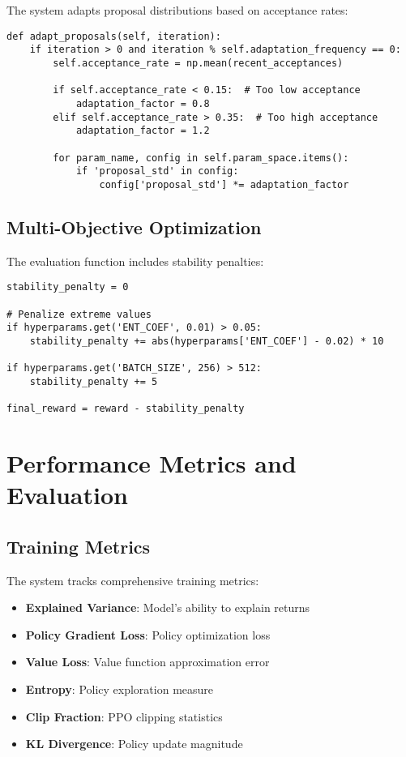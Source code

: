 \documentclass[11pt,a4paper]{article}
\begin{document}
The system adapts proposal distributions based on acceptance rates:

\begin{lstlisting}[caption={Adaptive Proposals (hyperparameter\_optimizer.py:359-379)}]
def adapt_proposals(self, iteration):
    if iteration > 0 and iteration % self.adaptation_frequency == 0:
        self.acceptance_rate = np.mean(recent_acceptances)
        
        if self.acceptance_rate < 0.15:  # Too low acceptance
            adaptation_factor = 0.8
        elif self.acceptance_rate > 0.35:  # Too high acceptance
            adaptation_factor = 1.2
            
        for param_name, config in self.param_space.items():
            if 'proposal_std' in config:
                config['proposal_std'] *= adaptation_factor
\end{lstlisting}

\subsection{Multi-Objective Optimization}

The evaluation function includes stability penalties:

\begin{lstlisting}[caption={Multi-Objective Evaluation (hyperparameter\_optimizer.py:272-283)}]
stability_penalty = 0

# Penalize extreme values
if hyperparams.get('ENT_COEF', 0.01) > 0.05:
    stability_penalty += abs(hyperparams['ENT_COEF'] - 0.02) * 10

if hyperparams.get('BATCH_SIZE', 256) > 512:
    stability_penalty += 5

final_reward = reward - stability_penalty
\end{lstlisting}

\section{Performance Metrics and Evaluation}

\subsection{Training Metrics}

The system tracks comprehensive training metrics:

\begin{itemize}
    \item \textbf{Explained Variance}: Model's ability to explain returns
    \item \textbf{Policy Gradient Loss}: Policy optimization loss
    \item \textbf{Value Loss}: Value function approximation error
    \item \textbf{Entropy}: Policy exploration measure
    \item \textbf{Clip Fraction}: PPO clipping statistics
    \item \textbf{KL Divergence}: Policy update magnitude
\end{itemize}
\end{document}

